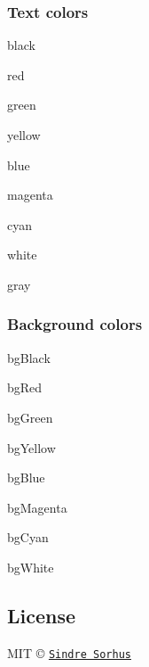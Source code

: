 \subsubsection*{Text colors}


\begin{DoxyItemize}
\item {\ttfamily black}
\item {\ttfamily red}
\item {\ttfamily green}
\item {\ttfamily yellow}
\item {\ttfamily blue}
\item {\ttfamily magenta}
\item {\ttfamily cyan}
\item {\ttfamily white}
\item {\ttfamily gray}
\end{DoxyItemize}

\subsubsection*{Background colors}


\begin{DoxyItemize}
\item {\ttfamily bg\+Black}
\item {\ttfamily bg\+Red}
\item {\ttfamily bg\+Green}
\item {\ttfamily bg\+Yellow}
\item {\ttfamily bg\+Blue}
\item {\ttfamily bg\+Magenta}
\item {\ttfamily bg\+Cyan}
\item {\ttfamily bg\+White}
\end{DoxyItemize}

\subsection*{License}

M\+IT © \href{http://sindresorhus.com}{\tt Sindre Sorhus} 